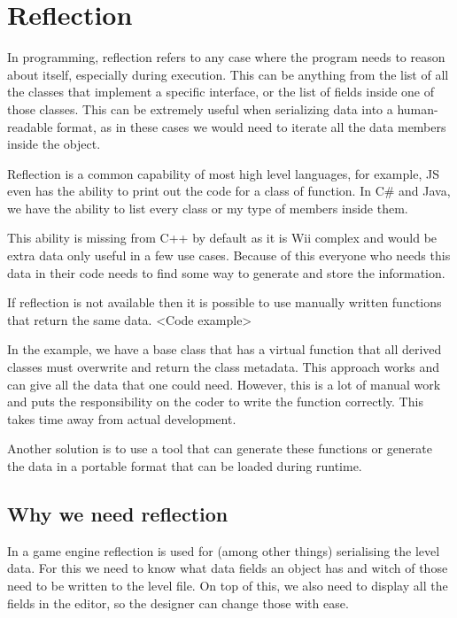\chapter{Reflection}\label{ch:reflection}

In programming, reflection refers to any case where the program needs to reason about itself, especially during execution.
This can be anything from the list of all the classes that implement a specific interface, or the list of fields inside one of those classes.
This can be extremely useful when serializing data into a human-readable format, as in these cases we would need to iterate all the data members inside the object.

Reflection is a common capability of most high level languages, for example, JS even has the ability to print out the code for a class of function.
In C\# and Java, we have the ability to list every class or my type of members inside them.

This ability is missing from C++ by default as it is Wii complex and would be extra data only useful in a few use cases.
Because of this everyone who needs this data in their code needs to find some way to generate and store the information.

If reflection is not available then it is possible to use manually written functions that return the same data.
<Code example>

In the example, we have a base class that has a virtual function that all derived classes must overwrite and return the class metadata.
This approach works and can give all the data that one could need.
However, this is a lot of manual work and puts the responsibility on the coder to write the function correctly.
This takes time away from actual development.

Another solution is to use a tool that can generate these functions or generate the data in a portable format that can be loaded during runtime.


\section{Why we need reflection}\label{sec:why-we-need-reflection}

In a game engine reflection is used for (among other things) serialising the level data.
For this we need to know what data fields an object has and witch of those need to be written to the level file.
On top of this, we also need to display all the fields in the editor, so the designer can change those with ease.

